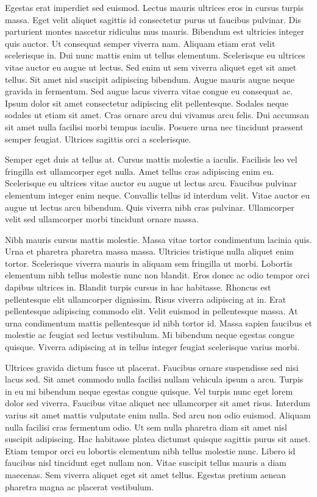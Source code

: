 \documentclass[11pt,a4paper]{article}
\begin{document}
Egestas erat imperdiet sed euismod. Lectus mauris ultrices eros in cursus turpis massa. Eget velit aliquet sagittis id consectetur purus ut faucibus pulvinar. Dis parturient montes nascetur ridiculus mus mauris. Bibendum est ultricies integer quis auctor. Ut consequat semper viverra nam. Aliquam etiam erat velit scelerisque in. Dui nunc mattis enim ut tellus elementum. Scelerisque eu ultrices vitae auctor eu augue ut lectus. Sed enim ut sem viverra aliquet eget sit amet tellus. Sit amet nisl suscipit adipiscing bibendum. Augue mauris augue neque gravida in fermentum. Sed augue lacus viverra vitae congue eu consequat ac. Ipsum dolor sit amet consectetur adipiscing elit pellentesque. Sodales neque sodales ut etiam sit amet. Cras ornare arcu dui vivamus arcu felis. Dui accumsan sit amet nulla facilisi morbi tempus iaculis. Posuere urna nec tincidunt praesent semper feugiat. Ultrices sagittis orci a scelerisque.

Semper eget duis at tellus at. Cursus mattis molestie a iaculis. Facilisis leo vel fringilla est ullamcorper eget nulla. Amet tellus cras adipiscing enim eu. Scelerisque eu ultrices vitae auctor eu augue ut lectus arcu. Faucibus pulvinar elementum integer enim neque. Convallis tellus id interdum velit. Vitae auctor eu augue ut lectus arcu bibendum. Quis viverra nibh cras pulvinar. Ullamcorper velit sed ullamcorper morbi tincidunt ornare massa.

Nibh mauris cursus mattis molestie. Massa vitae tortor condimentum lacinia quis. Urna et pharetra pharetra massa massa. Ultricies tristique nulla aliquet enim tortor. Scelerisque viverra mauris in aliquam sem fringilla ut morbi. Lobortis elementum nibh tellus molestie nunc non blandit. Eros donec ac odio tempor orci dapibus ultrices in. Blandit turpis cursus in hac habitasse. Rhoncus est pellentesque elit ullamcorper dignissim. Risus viverra adipiscing at in. Erat pellentesque adipiscing commodo elit. Velit euismod in pellentesque massa. At urna condimentum mattis pellentesque id nibh tortor id. Massa sapien faucibus et molestie ac feugiat sed lectus vestibulum. Mi bibendum neque egestas congue quisque. Viverra adipiscing at in tellus integer feugiat scelerisque varius morbi.

Ultrices gravida dictum fusce ut placerat. Faucibus ornare suspendisse sed nisi lacus sed. Sit amet commodo nulla facilisi nullam vehicula ipsum a arcu. Turpis in eu mi bibendum neque egestas congue quisque. Vel turpis nunc eget lorem dolor sed viverra. Faucibus vitae aliquet nec ullamcorper sit amet risus. Interdum varius sit amet mattis vulputate enim nulla. Sed arcu non odio euismod. Aliquam nulla facilisi cras fermentum odio. Ut sem nulla pharetra diam sit amet nisl suscipit adipiscing. Hac habitasse platea dictumst quisque sagittis purus sit amet. Etiam tempor orci eu lobortis elementum nibh tellus molestie nunc. Libero id faucibus nisl tincidunt eget nullam non. Vitae suscipit tellus mauris a diam maecenas. Sem viverra aliquet eget sit amet tellus. Egestas pretium aenean pharetra magna ac placerat vestibulum.
\end{document}
